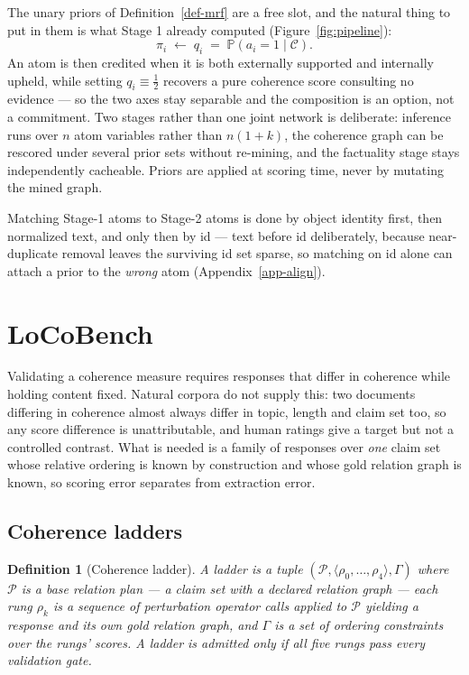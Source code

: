 \documentclass{article} %
\newtheorem{definition}{Definition}
\newcommand{\pr}[1]{\mathbb{P}\!\left( #1 \right)}
\begin{document}
The unary priors of Definition~\ref{def-mrf} are a free slot, and the natural thing to put
in them is what Stage 1 already computed (Figure~\ref{fig:pipeline}):
\begin{equation}
\pi_i \;\leftarrow\; q_i \;=\; \pr{a_i=1 \mid \mathcal{C}} .
\label{eq-priors}
\end{equation}
An atom is then credited when it is both externally supported and internally upheld, while setting
$q_i\equiv\tfrac12$ recovers a pure coherence score consulting no evidence --- so the two axes stay
separable and the composition is an option, not a commitment. Two stages rather than one joint
network is deliberate: inference runs over $n$ atom variables rather than $n(1{+}k)$, the coherence
graph can be rescored under several prior sets without re-mining, and the factuality stage stays
independently cacheable. Priors are applied at scoring time, never by mutating the mined graph.

Matching Stage-1 atoms to Stage-2 atoms is done by object identity first, then normalized text,
and only then by id --- text before id deliberately, because near-duplicate removal leaves the
surviving id set sparse, so matching on id alone can attach a prior to the \emph{wrong} atom
(Appendix~\ref{app-align}).

\section{LoCoBench}
\label{sec-locobench}

Validating a coherence measure requires responses that differ in coherence while holding content
fixed. Natural corpora do not supply this: two documents differing in coherence almost always
differ in topic, length and claim set too, so any score difference is unattributable, and human
ratings give a target but not a controlled contrast. What is needed is a family of responses over
\emph{one} claim set whose relative ordering is known by construction and whose gold relation
graph is known, so scoring error separates from extraction error.

\subsection{Coherence ladders}

\begin{definition}[Coherence ladder]
\label{def-ladder}
A \emph{ladder} is a tuple $(\mathcal{P}, \langle \rho_0,\dots,\rho_4\rangle, \Gamma)$ where
$\mathcal{P}$ is a base \emph{relation plan} --- a claim set with a declared relation graph
--- each rung $\rho_k$ is a sequence of perturbation operator calls applied to $\mathcal{P}$
yielding a response and its own gold relation graph, and $\Gamma$ is a set of ordering
constraints over the rungs' scores. A ladder is \emph{admitted} only if all five rungs pass
every validation gate.
\end{definition}
\end{document}
